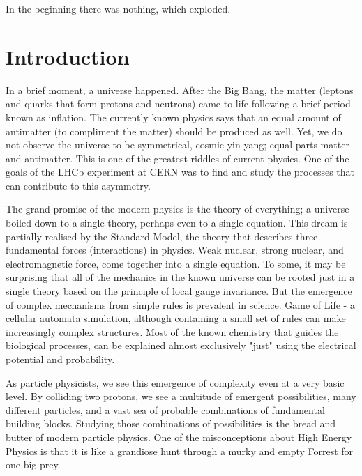 \begin{savequote}[75mm]
In the beginning there was nothing, which exploded.
\end{savequote}

\chapter{Introduction}
\label{introduction}

In a brief moment, a universe happened.
After the Big Bang, the matter (leptons and quarks that form protons and neutrons) came to life following a brief period known as inflation.
The currently known physics says that an equal amount of antimatter (to compliment the matter) should be produced as well.
Yet, we do not observe the universe to be symmetrical, cosmic yin-yang; equal parts matter and antimatter.
This is one of the greatest riddles of current physics.
One of the goals of the LHCb experiment at CERN was to find and study the processes that can contribute to this asymmetry.

The grand promise of the modern physics is the theory of everything; a universe boiled down to a single theory, perhaps even to a single equation.
This dream is partially realised by the Standard Model, the theory that describes three fundamental forces (interactions) in physics.
Weak nuclear, strong nuclear, and electromagnetic force, come together into a single equation.
To some, it may be surprising that all of the mechanics in the known universe can be rooted just in a single theory based on the principle of local gauge invariance.
But the emergence of complex mechanisms from simple rules is prevalent in science.
Game of Life - a cellular automata simulation, although containing a small set of rules can make increasingly complex structures.
Most of the known chemistry that guides the biological processes, can be explained almost exclusively "just" using the electrical potential and probability.

As particle physicists, we see this emergence of complexity even at a very basic level.
By colliding two protons, we see a multitude of emergent possibilities, many different particles, and a vast sea of probable combinations of fundamental building blocks.
Studying those combinations of possibilities is the bread and butter of modern particle physics.
One of the misconceptions about High Energy Physics is that it is like a grandiose hunt through a murky and empty Forrest for one big prey.

